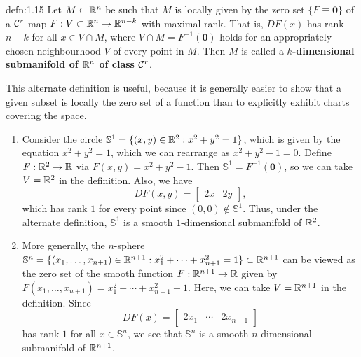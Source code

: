 \begin{defn}{defn:1.15}
    Let $M \subset \mathbb{R}^n$ be such that $M$ is locally given by the zero set 
    $\{F \equiv \mathbf 0\}$ of a ${\cal C}^r$ map $F : V \subset \mathbb{R}^n \to \mathbb{R}^{n-k}$ 
    with maximal rank. That is, 
    $DF(x)$ has rank $n - k$ for all $x \in V \cap M$, where $V \cap M 
    = F^{-1}(\mathbf 0)$ holds for an appropriately chosen neighbourhood $V$ 
    of every point in $M$. Then $M$ is called a 
    {\bf $k$-dimensional submanifold of $\mathbb{R}^n$ of class ${\cal C}^r$}.
\end{defn}\vspace{-0.25cm} 
This alternate definition is useful, because it is generally easier to show 
that a given subset is locally the zero set of a function than to 
explicitly exhibit charts covering the space. 
\begin{enumerate}[(1)]
    \item Consider the circle $\mathbb{S}^1 = \{(x, y) \in \mathbb{R}^2 : x^2 + y^2 = 1\}$, 
    which is given by the equation $x^2 + y^2 = 1$, which we can rearrange as 
    $x^2 + y^2 - 1 = 0$.
    Define $F : \mathbb{R}^2 \to \mathbb{R}$ via $F(x, y) = x^2 + y^2 - 1$. Then $\mathbb{S}^1 
    = F^{-1}(\mathbf 0)$, so we can take $V = \mathbb{R}^2$ in the definition. Also, we have 
    \[ DF(x, y) = \begin{bmatrix}
        2x & 2y 
    \end{bmatrix}, \] 
    which has rank $1$ for every point since $(0, 0) \notin \mathbb{S}^1$. 
    Thus, under the alternate definition, $\mathbb{S}^1$ is a smooth $1$-dimensional
    submanifold of $\mathbb{R}^2$. 

    \item More generally, the $n$-sphere $\mathbb{S}^n = \{(x_1, \dots, 
    x_{n+1}) \in \mathbb{R}^{n+1} : x_1^2 + \cdots + x_{n+1}^2 = 1\} \subset \mathbb{R}^{n+1}$ 
    can be viewed as the zero set of the smooth function $F : \mathbb{R}^{n+1} \to \mathbb{R}$ 
    given by $F(x_1, \dots, x_{n+1}) = x_1^2 + \cdots + x_{n+1}^2 - 1$. 
    Here, we can take $V = \mathbb{R}^{n+1}$ in the definition. Since 
    \[ DF(x) = \begin{bmatrix} 2x_1 & \cdots & 2x_{n+1} \end{bmatrix} \] 
    has rank $1$ for all $x \in \mathbb{S}^n$, we see that $\mathbb{S}^n$ 
    is a smooth $n$-dimensional submanifold of $\mathbb{R}^{n+1}$. 


\end{enumerate}
